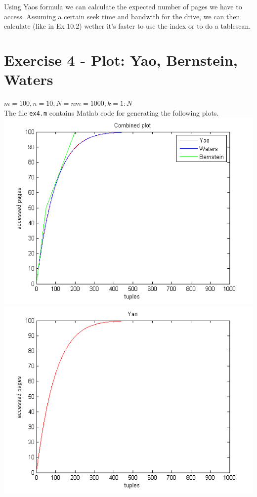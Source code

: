 \documentclass[11pt,a4paper]{scrartcl}
\begin{document}
Using Yaos formula we can calculate the expected number of pages we have to access.
Assuming a certain seek time and bandwith for the drive, we can then calculate (like in Ex 10.2) wether it's faster to use the index or to do a tablescan.



\section*{Exercise 4 - Plot: Yao, Bernstein, Waters}
$m = 100, n = 10, N = nm = 1000, k = 1:N$\\
The file \verb|ex4.m| contains Matlab code for generating the following plots.\\
\includegraphics{combined}\\
\includegraphics[scale=.9]{yao}\\
\end{document}
